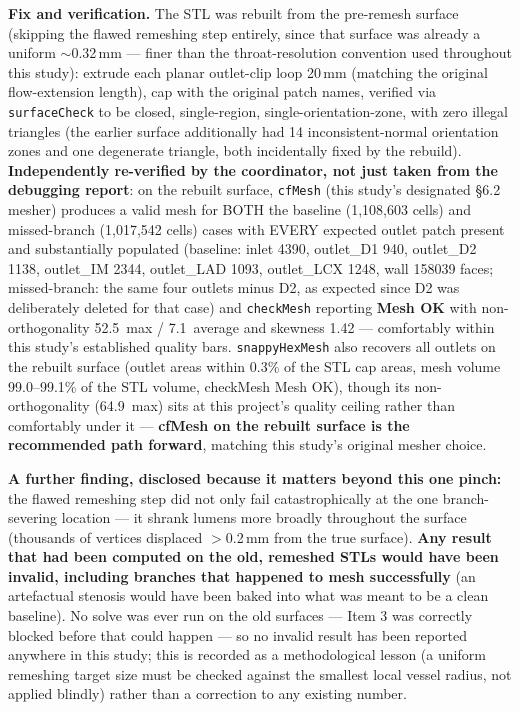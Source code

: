 \documentclass[11pt]{article}
\begin{document}
\textbf{Fix and verification.} The STL was rebuilt from the pre-remesh surface (skipping the flawed
remeshing step entirely, since that surface was already a uniform $\sim$0.32\,mm --- finer than the
throat-resolution convention used throughout this study): extrude each planar outlet-clip loop 20\,mm
(matching the original flow-extension length), cap with the original patch names, verified via
\texttt{surfaceCheck} to be closed, single-region, single-orientation-zone, with zero illegal triangles
(the earlier surface additionally had 14 inconsistent-normal orientation zones and one degenerate
triangle, both incidentally fixed by the rebuild). \textbf{Independently re-verified by the coordinator,
not just taken from the debugging report}: on the rebuilt surface, \texttt{cfMesh} (this study's
designated \S6.2 mesher) produces a valid mesh for BOTH the baseline (1,108,603 cells) and missed-branch
(1,017,542 cells) cases with EVERY expected outlet patch present and substantially populated (baseline:
inlet 4390, outlet\_D1 940, outlet\_D2 1138, outlet\_IM 2344, outlet\_LAD 1093, outlet\_LCX 1248, wall
158039 faces; missed-branch: the same four outlets minus D2, as expected since D2 was deliberately
deleted for that case) and \texttt{checkMesh} reporting \textbf{Mesh OK} with non-orthogonality
52.5\textdegree\ max / 7.1\textdegree\ average and skewness 1.42 --- comfortably within this study's
established quality bars. \texttt{snappyHexMesh} also recovers all outlets on the rebuilt surface (outlet
areas within 0.3\% of the STL cap areas, mesh volume 99.0--99.1\% of the STL volume, checkMesh Mesh OK),
though its non-orthogonality (64.9\textdegree\ max) sits at this project's quality ceiling rather than
comfortably under it --- \textbf{cfMesh on the rebuilt surface is the recommended path forward}, matching
this study's original mesher choice.

\textbf{A further finding, disclosed because it matters beyond this one pinch:} the flawed remeshing
step did not only fail catastrophically at the one branch-severing location --- it shrank lumens more
broadly throughout the surface (thousands of vertices displaced $>$0.2\,mm from the true surface).
\textbf{Any result that had been computed on the old, remeshed STLs would have been invalid, including
branches that happened to mesh successfully} (an artefactual stenosis would have been baked into what
was meant to be a clean baseline). No solve was ever run on the old surfaces --- Item 3 was correctly
blocked before that could happen --- so no invalid result has been reported anywhere in this study; this
is recorded as a methodological lesson (a uniform remeshing target size must be checked against the
smallest local vessel radius, not applied blindly) rather than a correction to any existing number.
\end{document}
